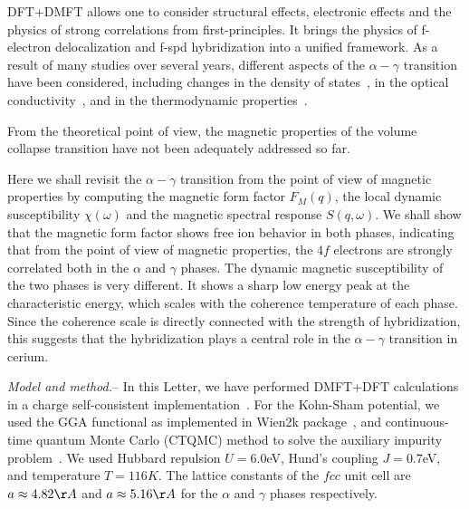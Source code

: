 \documentclass[10pt]{ruthesis}
\begin{document}
{DFT+DMFT allows one to
consider  structural effects, electronic effects and the physics of strong
correlations from first-principles. It brings the physics of
f-electron delocalization and f-spd hybridization into a unified
framework.
%
As a result of many studies over several years, different
aspects of the $\alpha-\gamma$ transition have been considered,
including changes in the density of states~\cite{zolf2001, held2001,
  mcmahan2003}, in the optical conductivity~\cite{hauleCe}, and in the
thermodynamic properties~\cite{amadon}. 

From the theoretical point of view, the magnetic properties of the
volume collapse transition have not been adequately addressed so far.

Here we shall revisit the $\alpha-\gamma$ transition from the point of
view of magnetic properties by computing the magnetic form factor
$F_{M}(q)$, the local dynamic susceptibility $\chi(\omega)$ and the
magnetic spectral response $S(q,\omega)$. We shall show that the
magnetic form factor shows free ion behavior in both phases,
indicating that from the point of view of magnetic properties, the
$4f$ electrons are strongly correlated both in the $\alpha$ and
$\gamma$ phases.  The dynamic magnetic susceptibility of the two
phases is very different. It shows a sharp low energy peak at the
characteristic energy, which scales with the coherence temperature of each
phase. Since the coherence scale is directly connected with the
strength of hybridization, this suggests that the hybridization plays
a central role in the $\alpha-\gamma$ transition in cerium.




{\it Model and method.}-- In this Letter, we have performed DMFT+DFT calculations in a charge self-consistent
implementation~\cite{hauleLDADMFT}. For the Kohn-Sham potential, we used the GGA functional
as implemented in Wien2k package~\cite{wien2k}, and continuous-time
quantum Monte Carlo (CTQMC) method to solve the auxiliary impurity
problem~\cite{hauleCTQMC}.  We used Hubbard repulsion $U=6.0$eV,
Hund's coupling $J=0.7$eV, and temperature $T=116K$.  The lattice
constants of the $fcc$ unit cell are $a \approx 4.82\AA$ and $a\approx
5.16\AA$ for the $\alpha$ and $\gamma$ phases respectively.


}
\end{document}
